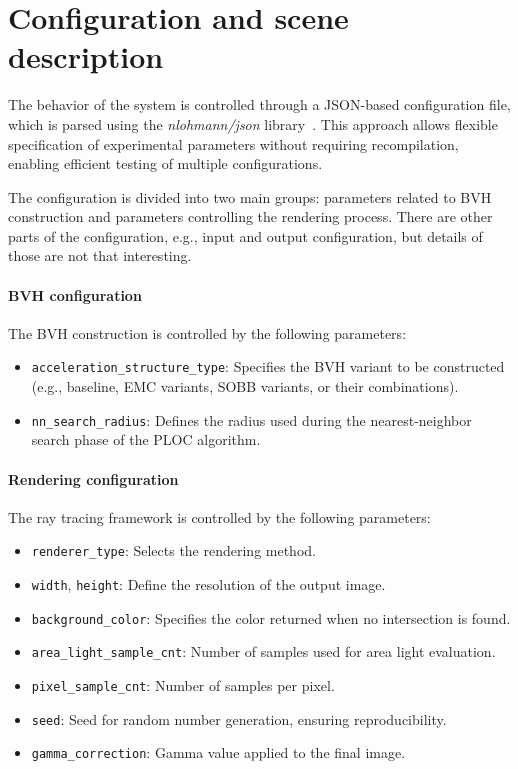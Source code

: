 \section{Configuration and scene description}

The behavior of the system is controlled through a JSON-based configuration file, which is parsed using the \textit{nlohmann/json} library~\cite{nlohmann_json}. This approach allows flexible specification of experimental parameters without requiring recompilation, enabling efficient testing of multiple configurations.

The configuration is divided into two main groups: parameters related to BVH construction and parameters controlling the rendering process. There are other parts of the configuration, e.g., input and output configuration, but details of those are not that interesting.

\paragraph{BVH configuration} The BVH construction is controlled by the following parameters:

\begin{itemize}
    \item \texttt{acceleration\_structure\_type}: Specifies the BVH variant to be constructed (e.g., baseline, EMC variants, SOBB variants, or their combinations).
    \item \texttt{nn\_search\_radius}: Defines the radius used during the nearest-neighbor search phase of the PLOC algorithm.
\end{itemize}

\paragraph{Rendering configuration} The ray tracing framework is controlled by the following parameters:

\begin{itemize}
    \item \texttt{renderer\_type}: Selects the rendering method.
    \item \texttt{width}, \texttt{height}: Define the resolution of the output image.
    \item \texttt{background\_color}: Specifies the color returned when no intersection is found.
    \item \texttt{area\_light\_sample\_cnt}: Number of samples used for area light evaluation.
    \item \texttt{pixel\_sample\_cnt}: Number of samples per pixel.
    \item \texttt{seed}: Seed for random number generation, ensuring reproducibility.
    \item \texttt{gamma\_correction}: Gamma value applied to the final image.
\end{itemize}


